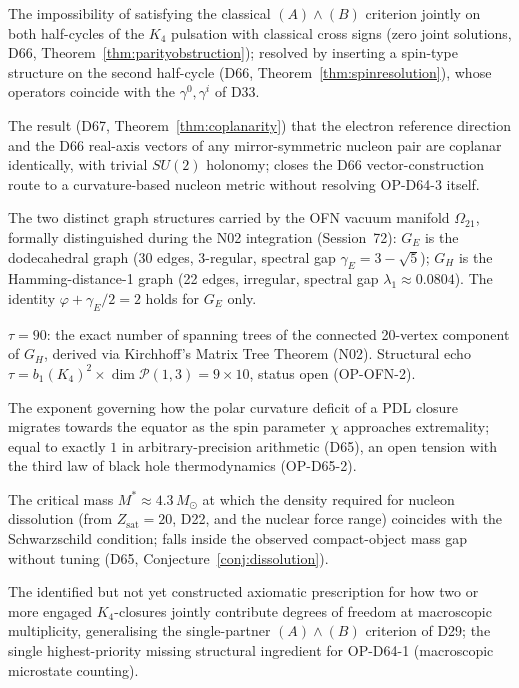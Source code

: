 \documentclass[11pt,a4paper]{article}
\theoremstyle{plain}
\theoremstyle{definition}
\theoremstyle{remark}
\newcommand{\Kfour}{K_4}
\newcommand{\Zsat}{Z_{\mathrm{sat}}}
\begin{document}
\begin{description}[leftmargin=3.5cm, style=nextline]
\item[Parity obstruction] The impossibility of satisfying the classical $(A)\wedge(B)$ criterion jointly on both half-cycles of the $K_4$ pulsation with classical cross signs (zero joint solutions, D66, Theorem~\ref{thm:parityobstruction}); resolved by inserting a spin-type structure on the second half-cycle (D66, Theorem~\ref{thm:spinresolution}), whose operators coincide with the $\gamma^0,\gamma^i$ of D33.
\item[Coplanarity theorem] The result (D67, Theorem~\ref{thm:coplanarity}) that the electron reference direction and the D66 real-axis vectors of any mirror-symmetric nucleon pair are coplanar identically, with trivial $SU(2)$ holonomy; closes the D66 vector-construction route to a curvature-based nucleon metric without resolving OP-D64-3 itself.
\item[$G_E$, $G_H$] The two distinct graph structures carried by the OFN vacuum manifold $\Omega_{21}$, formally distinguished during the N02 integration (Session~72): $G_E$ is the dodecahedral graph (30 edges, 3-regular, spectral gap $\gamma_E=3-\sqrt5$); $G_H$ is the Hamming-distance-1 graph (22 edges, irregular, spectral gap $\lambda_1\approx0.0804$). The identity $\varphi+\gamma_E/2=2$ holds for $G_E$ only.
\item[$\tau$ (spanning-tree invariant)] $\tau=90$: the exact number of spanning trees of the connected 20-vertex component of $G_H$, derived via Kirchhoff's Matrix Tree Theorem (N02). Structural echo $\tau=b_1(K_4)^2\times\dim\mathcal P(1,3)=9\times10$, status open (OP-OFN-2).
\item[Curvature-migration exponent] The exponent governing how the polar curvature deficit of a PDL closure migrates towards the equator as the spin parameter $\chi$ approaches extremality; equal to exactly $1$ in arbitrary-precision arithmetic (D65), an open tension with the third law of black hole thermodynamics (OP-D65-2).
\item[Dissolution threshold $M^*$] The critical mass $M^*\approx4.3\,M_\odot$ at which the density required for nucleon dissolution (from $\Zsat=20$, D22, and the nuclear force range) coincides with the Schwarzschild condition; falls inside the observed compact-object mass gap without tuning (D65, Conjecture~\ref{conj:dissolution}).
\item[$K_4\leftrightarrow K_4$ coupling rule] The identified but not yet constructed axiomatic prescription for how two or more engaged $\Kfour$-closures jointly contribute degrees of freedom at macroscopic multiplicity, generalising the single-partner $(A)\wedge(B)$ criterion of D29; the single highest-priority missing structural ingredient for OP-D64-1 (macroscopic microstate counting).

\end{description}
\end{document}

